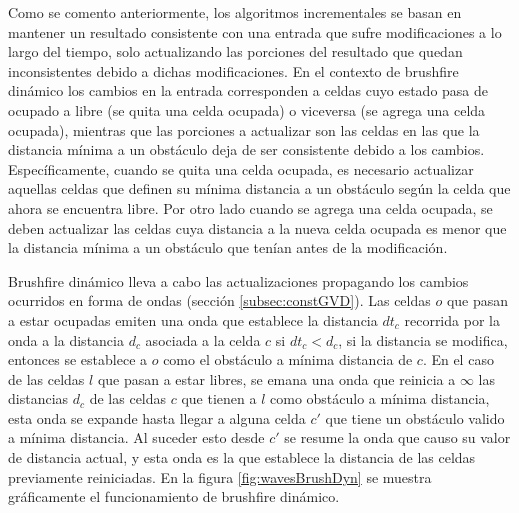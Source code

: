 Como se comento anteriormente, los algoritmos incrementales se basan en
mantener un resultado consistente con una entrada que sufre modificaciones a lo
largo del tiempo, solo actualizando las porciones del resultado que quedan
inconsistentes debido a dichas modificaciones.
En el contexto de brushfire dinámico los cambios en la entrada
corresponden a celdas cuyo estado pasa de ocupado a libre (se quita una
celda ocupada) o viceversa (se agrega una celda ocupada), mientras que las
porciones a actualizar son las celdas en las que la distancia
mínima a un obstáculo deja de ser consistente debido a los cambios.
Específicamente, cuando se quita una celda ocupada, es necesario actualizar
aquellas celdas que definen su mínima distancia a un obstáculo según la
celda que ahora se encuentra libre. 
Por otro lado cuando se agrega una celda ocupada, se deben actualizar las celdas 
cuya distancia a la nueva celda ocupada es menor que la distancia mínima a un
obstáculo que tenían antes de la modificación.

Brushfire dinámico lleva a cabo las actualizaciones propagando los cambios ocurridos
en forma de ondas (sección \ref{subsec:constGVD}). Las celdas $o$ que pasan a estar ocupadas emiten una onda
 que establece la distancia $dt_c$ recorrida por la onda a la
distancia $d_c$ asociada a la celda $c$ si $dt_{c}<d_{c}$, si la distancia se
modifica, entonces se establece a $o$ como el obstáculo a mínima distancia de $c$. En el
caso de las celdas $l$ que pasan a estar libres, se emana una onda
 que reinicia a $\infty$ las distancias $d_c$ de las celdas
$c$ que tienen a $l$ como obstáculo a mínima distancia, esta onda se expande
hasta llegar a alguna celda $c'$ que tiene un obstáculo valido a mínima
distancia. Al suceder esto desde $c'$ se resume la onda  que
causo su valor de distancia actual, y esta onda es la que establece la
distancia de las celdas previamente reiniciadas. En la figura
\ref{fig:wavesBrushDyn} se muestra gráficamente el funcionamiento de brushfire
dinámico.

